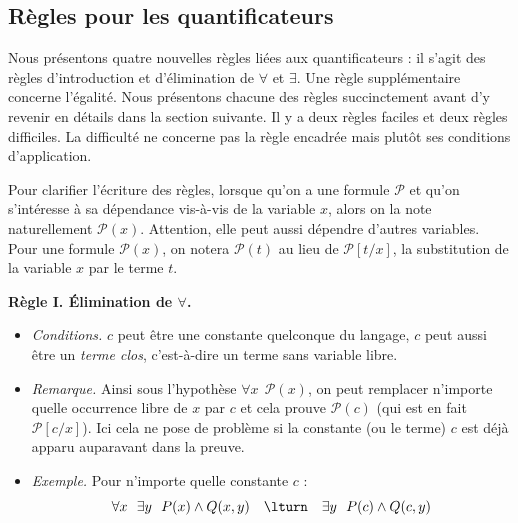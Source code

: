 \documentclass[11pt,class=report,crop=false]{standalone}
\begin{document}
\subsection{Règles pour les quantificateurs}


Nous présentons quatre nouvelles règles liées aux quantificateurs : il s'agit des règles d'introduction et d'élimination de $\forall$ et $\exists$.
Une règle supplémentaire concerne l'égalité.
Nous présentons chacune des règles succinctement avant d'y revenir en détails dans la section suivante.
Il y a deux règles faciles et deux règles difficiles.
La difficulté ne concerne pas la règle encadrée mais plutôt ses conditions d'application.

Pour clarifier l'écriture des règles, lorsque qu'on a une formule $\mathcal{P}$  et qu'on s'intéresse
à sa dépendance vis-à-vis de la variable $x$, alors on la note naturellement $\mathcal{P}(x)$. Attention, elle peut aussi dépendre d'autres variables.
Pour une formule $\mathcal{P}(x)$, on notera $\mathcal{P}(t)$ au lieu de $\mathcal{P}[t/x]$, la substitution de la variable $x$ par le terme $t$.



\bigskip

\textbf{Règle I. Élimination de $\forall$.} 

	\begin{itemize}
	\item \emph{Conditions.} $c$ peut être une constante quelconque du langage, $c$ peut aussi être un \emph{terme clos}, c'est-à-dire un terme sans variable libre.
	
	\item \emph{Remarque.} Ainsi sous l'hypothèse $\forall x \ \ \mathcal{P}(x)$, on peut remplacer n'importe quelle occurrence libre de $x$ par $c$ et cela prouve  $\mathcal{P}(c)$ (qui est en fait $\mathcal{P}[c/x]$).
	Ici cela ne pose de problème si la constante (ou le terme) $c$ est déjà apparu auparavant dans la preuve.
	
	\item \emph{Exemple.} Pour n'importe quelle constante $c$ :
	\[
	\forall x \ \ \exists y \ \ P(x) \land Q(x,y)  \quad \lturn \quad  \exists y \ \ P(c) \land Q(c,y)
	\]
	\end{itemize}
\end{document}
